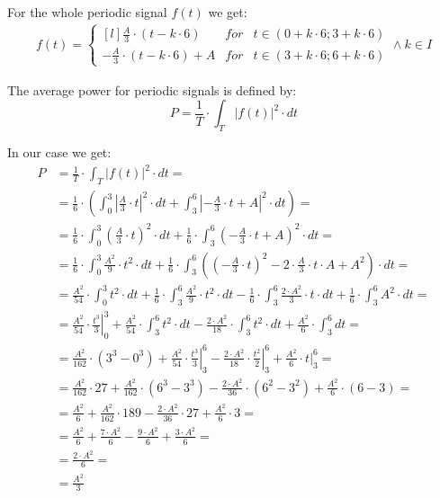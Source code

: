 \begin{task}
For the whole periodic signal $f(t)$ we get:
\begin{align*}
f(t) = \left\{\begin{matrix*}[l]
\frac{A}{3}\cdot \left( t - k\cdot 6 \right) & for &t \in (0 + k\cdot 6; 3 + k\cdot 6)\\ 
-\frac{A}{3}\cdot \left( t - k\cdot 6 \right) + A & for & t \in (3 + k \cdot 6; 6+ k\cdot 6)
\end{matrix*}\right. \wedge k \in I
\end{align*}

The average power for periodic signals is defined by:
\begin{equation}
P=\frac{1}{T} \cdot \int_{T}^{}\left|f(t)\right|^2 \cdot dt
\end{equation}

In our case we get:
\begin{align*}
P&=\frac{1}{T} \cdot \int_{T}^{}\left|f(t)\right|^2 \cdot dt=\\
 &=\frac{1}{6} \cdot \left( \int_{0}^{3}\left|\frac{A}{3}\cdot t \right|^2 \cdot dt
  +\int_{3}^{6}\left|-\frac{A}{3}\cdot t + A\right|^2 \cdot dt \right)=\\ 
 &=\frac{1}{6} \cdot \int_{0}^{3}\left(\frac{A}{3}\cdot t \right)^2 \cdot dt
  +\frac{1}{6} \cdot \int_{3}^{6}\left(-\frac{A}{3}\cdot t + A\right)^2 \cdot dt=\\ 
 &=\frac{1}{6} \cdot \int_{0}^{3}\frac{A^2}{9}\cdot t^2 \cdot dt
 +\frac{1}{6} \cdot \int_{3}^{6}\left(\left(-\frac{A}{3}\cdot t\right)^2 - 2\cdot \frac{A}{3}\cdot t \cdot  A + A^2 \right) \cdot dt=\\ 
 &=\frac{A^2}{54}\cdot \int_{0}^{3} t^2 \cdot dt
 +\frac{1}{6} \cdot \int_{3}^{6}\frac{A^2}{9}\cdot t^2 \cdot dt - \frac{1}{6} \cdot \int_{3}^{6} \frac{2 \cdot A^2}{3}\cdot t \cdot dt + \frac{1}{6} \cdot \int_{3}^{6} A^2 \cdot dt=\\
 &=\frac{A^2}{54}\cdot \left. \frac{t^3}{3} \right|_{0}^{3}
 +\frac{A^2}{54}\cdot \int_{3}^{6} t^2 \cdot dt - \frac{2 \cdot A^2}{18}\cdot \int_{3}^{6} t^2 \cdot dt +\frac{A^2}{6}\cdot \int_{3}^{6} dt=\\
 &=\frac{A^2}{162}\cdot \left(3^3 - 0^3\right) + \frac{A^2}{54}\cdot \left. \frac{t^3}{3} \right|_{3}^{6} - \frac{2 \cdot A^2}{18}\cdot \left. \frac{t^2}{2} \right|_{3}^{6} + \frac{A^2}{6}\cdot \left. t \right|_{3}^{6}=\\
 &=\frac{A^2}{162}\cdot 27 + \frac{A^2}{162}\cdot \left(6^3 - 3^3\right) - \frac{2 \cdot A^2}{36}\cdot \left(6^2 - 3^2\right) + \frac{A^2}{6}\cdot (6-3)=\\
 &=\frac{A^2}{6} + \frac{A^2}{162}\cdot 189 - \frac{2 \cdot A^2}{36}\cdot 27 + \frac{A^2}{6}\cdot 3=\\
 &=\frac{A^2}{6} + \frac{7 \cdot A^2}{6} - \frac{9 \cdot A^2}{6} + \frac{3 \cdot A^2}{6}=\\
 &=\frac{2 \cdot A^2}{6}=\\
 &=\frac{A^2}{3}
\end{align*}


\end{task}
